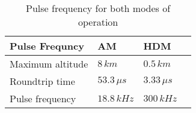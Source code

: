 \begin{table}[H]
\centering
\caption{Pulse frequency for both modes of operation}
\label{tab:f_pulse}
\begin{tabular}{|l|lll|}\hline
    \textbf{Pulse Frequncy} & AM & HDM \\
    \hline 
    Maximum altitude & $8\,km$ & $0.5\,km$ \\
    Roundtrip time & $53.3\,\mu s$ & $3.33\,\mu s$ \\
    Pulse frequency & $18.8\,kHz$ & $300\,kHz$ \\
    \hline 
\end{tabular}
\end{table}
